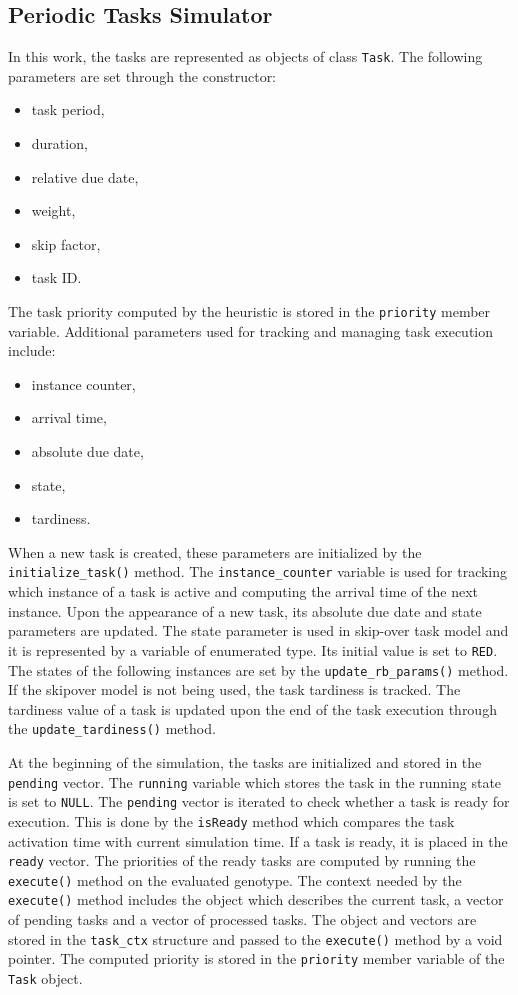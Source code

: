 \subsection{Periodic Tasks Simulator}
In this work, the tasks are represented as objects of class \texttt{Task}.
The following parameters are set through the constructor:
\begin{itemize}
	\item task period,
	\item duration,
	\item relative due date,
	\item weight,
	\item skip factor,
	\item task ID.
\end{itemize}
The task priority computed by the heuristic is stored in the \texttt{priority} member variable.
Additional parameters used for tracking and managing task execution include:
\begin{itemize}
	\item instance counter,
	\item arrival time,
	\item absolute due date,
	\item state,
	\item tardiness.
\end{itemize}
When a new task is created, these parameters are initialized by the \texttt{initialize\_task()} method.
The \texttt{instance\_counter} variable is used for tracking which instance of a task is active and computing the arrival time of the next instance.
Upon the appearance of a new task, its absolute due date and state parameters are updated.
The state parameter is used in skip-over task model and it is represented by a variable of enumerated type. Its initial value is set to \texttt{RED}.
The states of the following instances are set by the \texttt{update\_rb\_params()} method.
If the skipover model is not being used, the task tardiness is tracked.
The tardiness value of a task is updated upon the end of the task execution through the \texttt{update\_tardiness()} method.

At the beginning of the simulation, the tasks are initialized and stored in the \texttt{pending} vector.
The \texttt{running} variable which stores the task in the running state is set to \texttt{NULL}.
The \texttt{pending} vector is iterated to check whether a task is ready for execution.
This is done by the \texttt{isReady} method which compares the task activation time with current simulation time.
If a task is ready, it is placed in the \texttt{ready} vector.
The priorities of the ready tasks are computed by running the \texttt{execute()} method on the evaluated genotype.
The context needed by the \texttt{execute()} method includes the object which describes the current task, a vector of pending tasks and a vector of processed tasks.
The object and vectors are stored in the \texttt{task\_ctx} structure and passed to the \texttt{execute()} method by a void pointer.
The computed priority is stored in the \texttt{priority} member variable of the \texttt{Task} object.

